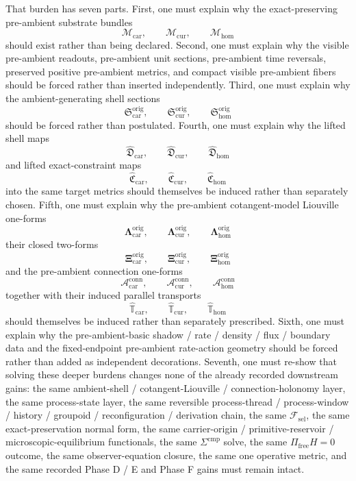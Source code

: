 \documentclass[11pt]{article}
\newcommand{\StemFunctional}{\mathscr F_{\mathrm{sel}}}
\newcommand{\TensorOriginSpace}{\mathcal M_{\mathrm{car}}}
\newcommand{\CurOriginSpace}{\mathcal M_{\mathrm{cur}}}
\newcommand{\HomOriginSpace}{\mathcal M_{\mathrm{hom}}}
\newcommand{\TensorOriginSection}{\mathfrak S_{\mathrm{car}}^{\mathrm{orig}}}
\newcommand{\CurOriginSection}{\mathfrak S_{\mathrm{cur}}^{\mathrm{orig}}}
\newcommand{\HomOriginSection}{\mathfrak S_{\mathrm{hom}}^{\mathrm{orig}}}
\newcommand{\TensorLiftedShellSection}{\widehat{\mathfrak D}_{\mathrm{car}}}
\newcommand{\CurLiftedShellSection}{\widehat{\mathfrak D}_{\mathrm{cur}}}
\newcommand{\HomLiftedShellSection}{\widehat{\mathfrak D}_{\mathrm{hom}}}
\newcommand{\TensorOriginConstraintMap}{\widehat{\mathfrak C}_{\mathrm{car}}}
\newcommand{\CurOriginConstraintMap}{\widehat{\mathfrak C}_{\mathrm{cur}}}
\newcommand{\HomOriginConstraintMap}{\widehat{\mathfrak C}_{\mathrm{hom}}}
\newcommand{\TensorOriginLiouville}{\boldsymbol{\Lambda}_{\mathrm{car}}^{\mathrm{orig}}}
\newcommand{\CurOriginLiouville}{\boldsymbol{\Lambda}_{\mathrm{cur}}^{\mathrm{orig}}}
\newcommand{\HomOriginLiouville}{\boldsymbol{\Lambda}_{\mathrm{hom}}^{\mathrm{orig}}}
\newcommand{\TensorOriginTwo}{\boldsymbol{\Xi}_{\mathrm{car}}^{\mathrm{orig}}}
\newcommand{\CurOriginTwo}{\boldsymbol{\Xi}_{\mathrm{cur}}^{\mathrm{orig}}}
\newcommand{\HomOriginTwo}{\boldsymbol{\Xi}_{\mathrm{hom}}^{\mathrm{orig}}}
\newcommand{\TensorConnectionForm}{\mathcal A_{\mathrm{car}}^{\mathrm{conn}}}
\newcommand{\CurConnectionForm}{\mathcal A_{\mathrm{cur}}^{\mathrm{conn}}}
\newcommand{\HomConnectionForm}{\mathcal A_{\mathrm{hom}}^{\mathrm{conn}}}
\newcommand{\TensorOriginTransport}{\widehat{\mathbb T}_{\mathrm{car}}}
\newcommand{\CurOriginTransport}{\widehat{\mathbb T}_{\mathrm{cur}}}
\newcommand{\HomOriginTransport}{\widehat{\mathbb T}_{\mathrm{hom}}}
\begin{document}
That burden has seven parts. First, one must explain why the exact-preserving pre-ambient substrate bundles
\[
\TensorOriginSpace,\qquad
\CurOriginSpace,\qquad
\HomOriginSpace
\]
should exist rather than being declared. Second, one must explain why the visible pre-ambient readouts, pre-ambient unit sections, pre-ambient time reversals, preserved positive pre-ambient metrics, and compact visible pre-ambient fibers should be forced rather than inserted independently. Third, one must explain why the ambient-generating shell sections
\[
\TensorOriginSection,\qquad
\CurOriginSection,\qquad
\HomOriginSection
\]
should be forced rather than postulated. Fourth, one must explain why the lifted shell maps
\[
\TensorLiftedShellSection,\qquad
\CurLiftedShellSection,\qquad
\HomLiftedShellSection
\]
and lifted exact-constraint maps
\[
\TensorOriginConstraintMap,\qquad
\CurOriginConstraintMap,\qquad
\HomOriginConstraintMap
\]
into the same target metrics should themselves be induced rather than separately chosen. Fifth, one must explain why the pre-ambient cotangent-model Liouville one-forms
\[
\TensorOriginLiouville,\qquad
\CurOriginLiouville,\qquad
\HomOriginLiouville
\]
their closed two-forms
\[
\TensorOriginTwo,\qquad
\CurOriginTwo,\qquad
\HomOriginTwo
\]
and the pre-ambient connection one-forms
\[
\TensorConnectionForm,\qquad
\CurConnectionForm,\qquad
\HomConnectionForm
\]
together with their induced parallel transports
\[
\TensorOriginTransport,\qquad
\CurOriginTransport,\qquad
\HomOriginTransport
\]
should themselves be induced rather than separately prescribed. Sixth, one must explain why the pre-ambient-basic shadow / rate / density / flux / boundary data and the fixed-endpoint pre-ambient rate-action geometry should be forced rather than added as independent decorations. Seventh, one must re-show that solving these deeper burdens changes none of the already recorded downstream gains: the same ambient-shell / cotangent-Liouville / connection-holonomy layer, the same process-state layer, the same reversible process-thread / process-window / history / groupoid / reconfiguration / derivation chain, the same \(\StemFunctional\), the same exact-preservation normal form, the same carrier-origin / primitive-reservoir / microscopic-equilibrium functionals, the same \(\Sigma^{\mathrm{cmp}}\) solve, the same \(\Pi_{\mathrm{free}}H=0\) outcome, the same observer-equation closure, the same one operative metric, and the same recorded Phase D / E and Phase F gains must remain intact.
\end{document}
